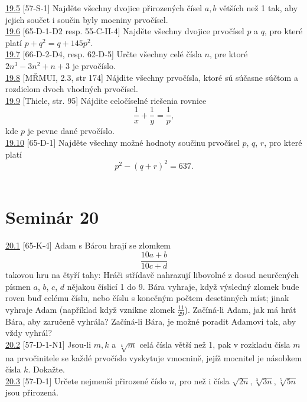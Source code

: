 \noindent \ul{19.5} [57-S-1]
Najděte všechny dvojice přirozených čísel $a, b$ větších než 1 tak, aby jejich součet i součin byly mocniny prvočísel.\\

\noindent \ul{19.6} [65-D-1-D2 resp. 55-C-II-4] Najděte všechny dvojice
prvočísel $p$ a $q$, pro které platí $p + q^2= q + 145p^2$.\\

\noindent \ul{19.7} [66-D-2-D4, resp. 62-D-5]
Určte všechny celé čísla $n$, pre ktoré $2n^3 -3n^2 +n+3$ je prvočíslo.\\

\noindent \ul{19.8} [MŘMUI, 2.3, str 174] Nájdite všechny prvočísla, ktoré sú súčasne súčtom a rozdielom dvoch vhodných prvočísel.\\

\noindent \ul{19.9} [Thiele, str. 95] Nájdite celočíselné riešenia rovnice $$\frac{1}{x}+\frac{1}{y}=\frac{1}{p},$$ kde $p$ je pevne dané prvočíslo.\\

\noindent \ul{19.10} [65-D-1]
Najděte všechny možné hodnoty součinu prvočísel $p$, $q$, $r$, pro které platí
$$p^2 - (q + r)^2= 637.$$\\

\section*{Seminár 20}
\noindent \ul{20.1} [65-K-4] Adam s Bárou hrají se zlomkem
$$ \frac{10a + b}{10c + d}$$ takovou hru na čtyří tahy: Hráči střídavě nahrazují libovolné z dosud
neurčených písmen $a$, $b$, $c$, $d$ nějakou číslicí 1 do 9. Bára vyhraje, když výsledný zlomek bude
roven buď celému číslu, nebo číslu s konečným počtem desetinných míst; jinak vyhraje Adam (například
když vznikne zlomek $\frac{11}{29}$). Začíná-li Adam, jak má hrát Bára, aby zaručeně vyhrála?
Začíná-li Bára, je možné poradit Adamovi tak, aby vždy vyhrál?\\

\noindent \ul{20.2} [57-D-1-N1] Jsou-li $m, k$ a $\sqrt[k]{m}$ celá čísla větší než 1, pak v
rozkladu čísla $m$ na prvočinitele se každé prvočíslo vyskytuje vmocnině, jejíž mocnitel je násobkem
čísla $k$. Dokažte.\\

\noindent \ul{20.3} [57-D-1]
Určete nejmenší přirozené číslo $n$, pro než i čísla
$\sqrt{2n}, \sqrt[3]{3n}, \sqrt[5]{5n}$ jsou přirozená.\\

